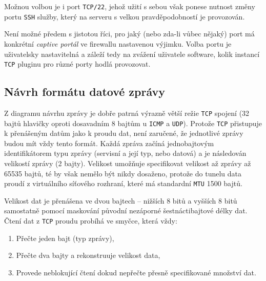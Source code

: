 \documentclass[thesis=M,czech]{FITthesis}[2012/10/20]
\begin{document}
    Možnou volbou je i port \texttt{TCP/22}, jehož užití s sebou však ponese nutnost změny portu \texttt{SSH} služby, který na serveru s velkou pravděpodobností je provozován.
    
    Není možné předem s jistotou říci, pro jaký (nebo zda-li vůbec nějaký) port má konkrétní \textit{captive portál} ve firewallu nastavenou výjimku. Volba portu je uživatelsky nastavitelná a záleží tedy na zvážení uživatele software, kolik instancí \texttt{TCP} pluginu pro různé porty hodlá provozovat.
    
    \subsection{Návrh formátu datové zprávy}
    
    Z diagramu návrhu zprávy je dobře patrná výrazně větší režie \texttt{TCP} spojení (32 bajtů hlavičky oproti dosavadním 8 bajtům u \texttt{ICMP} a \texttt{UDP}). Protože \texttt{TCP} přistupuje k přenášeným datům jako k proudu dat, není zaručené, že jednotlivé zprávy budou mít vždy tento formát. Každá zpráva začíná jednobajtovým identifikátorem typu zprávy (servisní a její typ, nebo datová) a je následován velikostí zprávy (2 bajty). Velikost umožňuje specifikovat velikost až zprávy až 65535 bajtů, té by však nemělo být nikdy dosaženo, protože do tunelu data proudí z virtuálního síťového rozhraní, které má standardní \texttt{MTU} 1500 bajtů.
    
    Velikost dat je přenášena ve dvou bajtech -- nižších 8 bitů a vyšších 8 bitů samostatně pomocí maskování původní nezáporné šestnáctibajtové délky dat. Čtení dat z \texttt{TCP} proudu probíhá ve smyčce, která vždy:
    \begin{enumerate}
     \item Přečte jeden bajt (typ zprávy),
     \item Přečte dva bajty a rekonstruuje velikost data,
     \item Provede neblokující čtení dokud nepřečte přesně specifikované množství dat.
    \end{enumerate}
    
    
    
\end{document}
